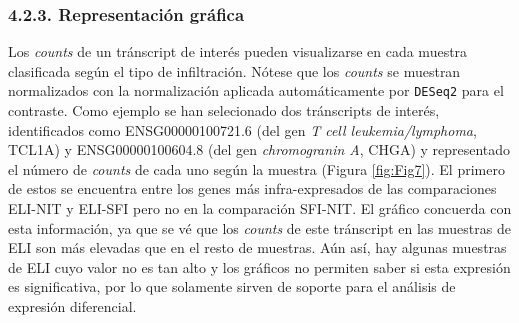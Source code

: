 \documentclass[
]{article}
\begin{document}
\begin{table}

\caption{\label{tab:unnamed-chunk-3}Genes significativos con mayor sobre-expresión del contraste ELI-SFI.}
\centering
{}
\end{table}

\hypertarget{representaciuxf3n-gruxe1fica}{%
\subsubsection{4.2.3. Representación
gráfica}\label{representaciuxf3n-gruxe1fica}}

Los \emph{counts} de un tránscript de interés pueden visualizarse en
cada muestra clasificada según el tipo de infiltración. Nótese que los
\emph{counts} se muestran normalizados con la normalización aplicada
automáticamente por \texttt{DESeq2} para el contraste. Como ejemplo se
han selecionado dos tránscripts de interés, identificados como
ENSG00000100721.6 (del gen \emph{T cell leukemia/lymphoma}, TCL1A) y
ENSG00000100604.8 (del gen \emph{chromogranin A}, CHGA) y representado
el número de \emph{counts} de cada uno según la muestra (Figura
\ref{fig:Fig7}). El primero de estos se encuentra entre los genes más
infra-expresados de las comparaciones ELI-NIT y ELI-SFI pero no en la
comparación SFI-NIT. El gráfico concuerda con esta información, ya que
se vé que los \emph{counts} de este tránscript en las muestras de ELI
son más elevadas que en el resto de muestras. Aún así, hay algunas
muestras de ELI cuyo valor no es tan alto y los gráficos no permiten
saber si esta expresión es significativa, por lo que solamente sirven de
soporte para el análisis de expresión diferencial.
\end{document}
